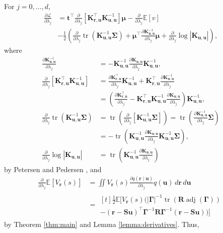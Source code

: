 \documentclass{mpaper}
\DeclareMathOperator{\adj}{adj}
\DeclareMathOperator{\tr}{tr}
\newcommand{\V}{V_{\mathbf{r}}}
\newcommand{\dx}{\,d\mathbf{r}\,d\mathbf{u}}
\newcommand{\Kuu}{\mathbf{K}_{\mathbf{u},\mathbf{u}}}
\newcommand{\Kru}{\mathbf{K}_{\mathbf{r},\mathbf{u}}}
\newcommand{\dlj}{\frac{\partial}{\partial \lambda_j}}
\begin{document}
For $j = 0, \dots, d$,
\[
  \begin{split}
    \frac{\partial \mathcal{L}}{\partial \lambda_j} &= \mathbf{t}^\intercal\dlj
    \left[ \Kru^\intercal\Kuu^{-1} \right] \bm\mu - \dlj\mathbb{E}[v] \\
    &- \frac{1}{2} \left(\dlj \tr \left(\Kuu^{-1}\bm\Sigma \right) +
      \bm\mu^\intercal \frac{\partial \Kuu^{-1}}{\partial \lambda_j} \bm\mu +
      \dlj \log |\Kuu| \right),
  \end{split}
\]
where
\begin{align*}
  \frac{\partial \Kuu^{-1}}{\partial \lambda_j} &= -\Kuu^{-1}\frac{\partial \Kuu}{\partial \lambda_j}\Kuu^{-1}, \\
  \dlj \left[ \Kru^\intercal\Kuu^{-1} \right] &= \frac{\partial \Kru^\intercal}{\partial \lambda_j} \Kuu^{-1} + \Kru^\intercal \frac{\partial \Kuu^{-1}}{\partial \lambda_j} \\
                                                &= \left( \frac{\partial \Kru^\intercal}{\partial \lambda_j} - \Kru^\intercal\Kuu^{-1}\frac{\partial \Kuu}{\partial \lambda_j} \right) \Kuu^{-1}, \\
  \dlj \tr(\Kuu^{-1}\bm\Sigma) &= \tr \left( \dlj \left[ \Kuu^{-1}\bm\Sigma \right] \right) = \tr \left( \frac{\partial \Kuu^{-1}}{\partial \lambda_j} \bm\Sigma \right) \\
                                                &= -\tr \left( \Kuu^{-1} \frac{\partial \Kuu}{\partial \lambda_j} \Kuu^{-1} \bm\Sigma \right), \\
  \dlj\log|\Kuu| &= \tr \left( \Kuu^{-1} \frac{\partial \Kuu}{\partial \lambda_j} \right)
\end{align*}
by Petersen and Pedersen \cite{petersen2008matrix}, and
\[
  \begin{split}
    \dlj \mathbb{E}[\V(s)] &= \iint\V(s)\frac{\partial q(\mathbf{r} \mid
      \mathbf{u})}{\partial \lambda_j}q(\mathbf{u})\dx \\
    &= \!\begin{multlined}[t]
      \frac{1}{2}\mathbb{E}[\V(s) (|\bm\Gamma|^{-1} \tr(\mathbf{R}
          \adj(\bm\Gamma)) \\
          - (\mathbf{r} -
          \mathbf{Su})^\intercal\bm\Gamma^{-1}\mathbf{R}\bm\Gamma^{-1}(\mathbf{r}
          - \mathbf{Su}))]
    \end{multlined}
  \end{split}
\]
by Theorem \ref{thm:main} and Lemma \ref{lemma:derivatives}. Thus,
\end{document}
